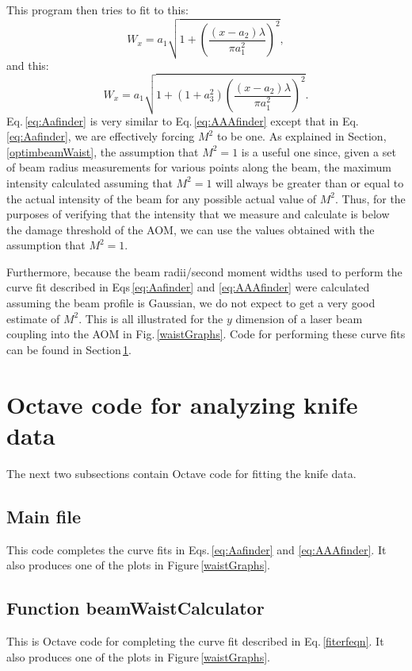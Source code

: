 This program then tries to fit to this:
\begin{equation}
W_x=a_1 \sqrt{1+\left(\frac{(x-a_2) \lambda}{\pi a_1^2}\right)^2}\label{eq:Aafinder},
\end{equation}
and this:
\begin{equation}
W_x=a_1 \sqrt{1+(1+a_3^2) \left(\frac{(x-a_2) \lambda}{\pi a_1^2}\right)^2}.\label{eq:AAAfinder} 
\end{equation}
Eq.\,\ref{eq:Aafinder} is very similar to Eq.\,\ref{eq:AAAfinder} except that in Eq.\,\ref{eq:Aafinder}, we are effectively forcing $M^2$ to be one. As explained in Section,\ref{optimbeamWaist}, the assumption that $M^2=1$ is a useful one since, given a set of beam radius measurements for various points along the beam, the maximum intensity calculated assuming that $M^2=1$ will always be greater than or equal to the actual intensity of the beam for any possible actual value of $M^2$. Thus, for the purposes of verifying that the intensity that we measure and calculate is below the damage threshold of the AOM, we can use the values obtained with the assumption that $M^2=1$. 

Furthermore, because the beam radii/second moment widths used to perform the curve fit described in Eqs\,\ref{eq:Aafinder} and \ref{eq:AAAfinder} were calculated assuming the beam profile is Gaussian, we do not expect to get a very good estimate of $M^2$. This is all illustrated for the $y$ dimension of a laser beam coupling into the AOM in Fig.\,\ref{waistGraphs}. Code for performing these curve fits can be found in Section\,\ref{OctaveCodeKnife}.

\section{Octave code for analyzing knife data}\label{OctaveCodeKnife}
The next two subsections contain Octave code for fitting the knife data.
\subsection{Main file}
This code completes the curve fits in Eqs.\,\ref{eq:Aafinder} and \ref{eq:AAAfinder}. It also produces one of the plots in Figure\,\ref{waistGraphs}.

\subsection{Function beamWaistCalculator}
This is Octave code for completing the curve fit described in Eq.\,\ref{fiterfeqn}. It also produces one of the plots in Figure\,\ref{waistGraphs}. 


